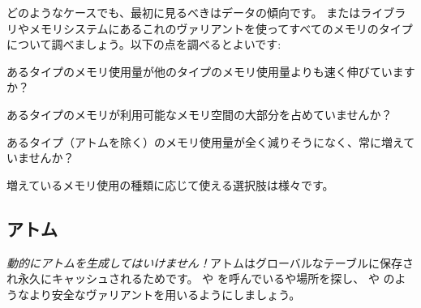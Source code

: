 どのようなケースでも、最初に見るべきはデータの傾向です。 またはライブラリやメモリシステムにあるこれのヴァリアントを使ってすべてのメモリのタイプについて調べましょう。以下の点を調べるとよいです:

\begin{itemize*}
	\item あるタイプのメモリ使用量が他のタイプのメモリ使用量よりも速く伸びていますか？
	\item あるタイプのメモリが利用可能なメモリ空間の大部分を占めていませんか？
	\item あるタイプ（アトムを除く）のメモリ使用量が全く減りそうになく、常に増えていませんか？
\end{itemize*}

増えているメモリ使用の種類に応じて使える選択肢は様々です。

\subsection{アトム}

\emph{動的にアトムを生成してはいけません！}アトムはグローバルなテーブルに保存され永久にキャッシュされるためです。 や  を呼んでいるや場所を探し、 や  のようなより安全なヴァリアントを用いるようにしましょう。

